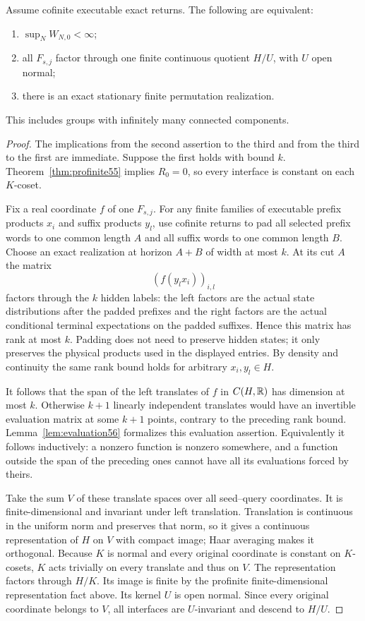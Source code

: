 \begin{theorem}\label{thm:zero55}
Assume cofinite executable exact returns. The following are equivalent:
\begin{enumerate}
\item $\sup_NW_{N,0}<\infty$;
\item all $F_{s,j}$ factor through one finite continuous quotient $H/U$, with $U$ open normal;
\item there is an exact stationary finite permutation realization.
\end{enumerate}
This includes groups with infinitely many connected components.
\end{theorem}
\begin{proof}
The implications from the second assertion to the third and from the third to the first are immediate. Suppose the first holds with bound $k$. Theorem~\ref{thm:profinite55} implies $R_0=0$, so every interface is constant on each $K$-coset.

Fix a real coordinate $f$ of one $F_{s,j}$. For any finite families of executable prefix products $x_i$ and suffix products $y_l$, use cofinite returns to pad all selected prefix words to one common length $A$ and all suffix words to one common length $B$. Choose an exact realization at horizon $A+B$ of width at most $k$. At its cut $A$ the matrix
\[
                            (f(y_lx_i))_{i,l}
\]
factors through the $k$ hidden labels: the left factors are the actual state distributions after the padded prefixes and the right factors are the actual conditional terminal expectations on the padded suffixes. Hence this matrix has rank at most $k$. Padding does not need to preserve hidden states; it only preserves the physical products used in the displayed entries. By density and continuity the same rank bound holds for arbitrary $x_i,y_l\in H$.

It follows that the span of the left translates of $f$ in $C(H,\mathbb R)$ has dimension at most $k$. Otherwise $k+1$ linearly independent translates would have an invertible evaluation matrix at some $k+1$ points, contrary to the preceding rank bound. Lemma~\ref{lem:evaluation56} formalizes this evaluation assertion. Equivalently it follows inductively: a nonzero function is nonzero somewhere, and a function outside the span of the preceding ones cannot have all its evaluations forced by theirs.

Take the sum $V$ of these translate spaces over all seed--query coordinates. It is finite-dimensional and invariant under left translation. Translation is continuous in the uniform norm and preserves that norm, so it gives a continuous representation of $H$ on $V$ with compact image; Haar averaging makes it orthogonal. Because $K$ is normal and every original coordinate is constant on $K$-cosets, $K$ acts trivially on every translate and thus on $V$. The representation factors through $H/K$. Its image is finite by the profinite finite-dimensional representation fact above. Its kernel $U$ is open normal. Since every original coordinate belongs to $V$, all interfaces are $U$-invariant and descend to $H/U$.
\end{proof}

